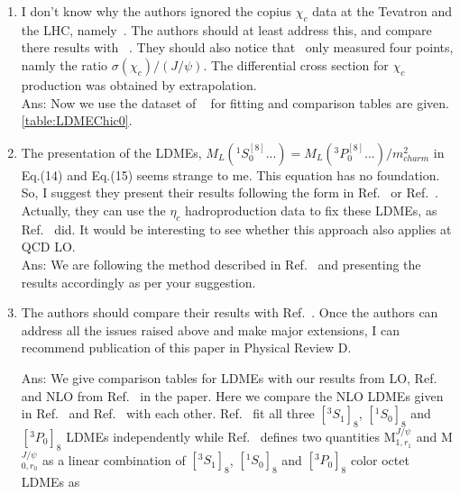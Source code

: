 \documentclass[aps,prc,preprint,superscriptaddress,showpacs,showkeys,amsmath]{revtex4-1}
\begin{document}
\begin{enumerate}
\item I don’t know why the authors ignored the copius $\chi_c$ data at the Tevatron 
and the LHC, namely~\cite{LHCb:2012af,Aaij:2013dja,Chatrchyan:2012ub,ATLAS:2014ala}. The authors 
should at least address this, and compare there results with ~\cite{Jia:2014jfa}. They should also notice that~\cite{Abe:1997yz} 
only measured four points, namly the ratio $\sigma(\chi_c)/(J/\psi)$. The differential 
cross section for $\chi_c$ production was obtained by extrapolation. \\
{\color{blue}
Ans: Now we use the dataset of ~\cite{LHCb:2012af,Aaij:2013dja,Chatrchyan:2012ub,ATLAS:2014ala} for fitting and
comparison tables are given.%
\ref{table:LDMEChic0}.
}

\item The presentation of the LDMEs, $M_L(^1S^{[8]}_0 ...) = M_L(^3P^{[8]}_0 ...)/m^2_{charm}$
in Eq.(14) and Eq.(15) seems strange to me. This equation has no foundation. 
So, I suggest they present their results following the form in Ref.~\cite{Beneke:1996yw} 
or Ref.~\cite{Cho:1995vh}. 
Actually, they can use the $\eta_c$ hadroproduction data to fix these LDMEs, as 
Ref.~\cite{Zhang:2014ybe} did. It would be interesting to see whether this approach also applies 
at QCD LO.\\

{\color{blue}
Ans: We are following the method described in Ref.~\cite{Cho:1995vh,Beneke:1996yw} and
presenting the results accordingly as per your suggestion.
}

\item The authors should compare their results with Ref.~\cite{Cho:1995vh, Braaten:1999qk, Sharma:2012dy}. Once the authors 
can address all the issues raised above and make major extensions, I can recommend 
publication of this paper in Physical Review D.\\


{\color{blue}

Ans: We give comparison tables for LDMEs with our results from LO, Ref.~\cite{Cho:1995vh, Braaten:1999qk, Sharma:2012dy} and 
NLO from Ref.~\cite{Butenschoen:2010rq,Ma:2010jj} in the paper. Here we compare the NLO LDMEs given 
in Ref.~\cite{Butenschoen:2010rq} and Ref.~\cite{Ma:2010jj} with each other. Ref.~\cite{Butenschoen:2010rq} fit all three 
$[^3S_1]_{8}$, $[^1S_0]_{8}$ and $[^3P_0]_{8}$ LDMEs independently while Ref.~\cite{Ma:2010jj} defines two 
quantities M$^{J/\psi}_{1,r_{1}}$  and  M$^{J/\psi}_{0,r_{0}}$ as a linear combination 
of $[^3S_1]_{8}$, $[^1S_0]_{8}$ and $[^3P_0]_{8}$ color octet LDMEs as
  
}
\end{enumerate}
\end{document}
